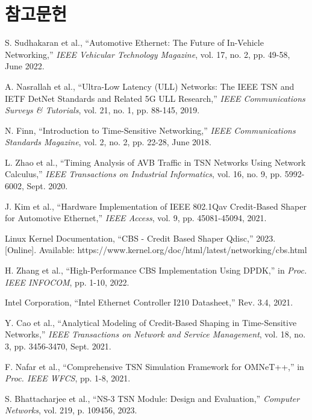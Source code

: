 \documentclass[twocolumn,10pt]{article}
\begin{document}
\section*{참고문헌}
\begin{thebibliography}{99}

S. Sudhakaran et al., ``Automotive Ethernet: The Future of In-Vehicle Networking,'' \textit{IEEE Vehicular Technology Magazine}, vol. 17, no. 2, pp. 49-58, June 2022.

A. Nasrallah et al., ``Ultra-Low Latency (ULL) Networks: The IEEE TSN and IETF DetNet Standards and Related 5G ULL Research,'' \textit{IEEE Communications Surveys \& Tutorials}, vol. 21, no. 1, pp. 88-145, 2019.

N. Finn, ``Introduction to Time-Sensitive Networking,'' \textit{IEEE Communications Standards Magazine}, vol. 2, no. 2, pp. 22-28, June 2018.

L. Zhao et al., ``Timing Analysis of AVB Traffic in TSN Networks Using Network Calculus,'' \textit{IEEE Transactions on Industrial Informatics}, vol. 16, no. 9, pp. 5992-6002, Sept. 2020.

J. Kim et al., ``Hardware Implementation of IEEE 802.1Qav Credit-Based Shaper for Automotive Ethernet,'' \textit{IEEE Access}, vol. 9, pp. 45081-45094, 2021.

Linux Kernel Documentation, ``CBS - Credit Based Shaper Qdisc,'' 2023. [Online]. Available: https://www.kernel.org/doc/html/latest/networking/cbs.html

H. Zhang et al., ``High-Performance CBS Implementation Using DPDK,'' in \textit{Proc. IEEE INFOCOM}, pp. 1-10, 2022.

Intel Corporation, ``Intel Ethernet Controller I210 Datasheet,'' Rev. 3.4, 2021.

Y. Cao et al., ``Analytical Modeling of Credit-Based Shaping in Time-Sensitive Networks,'' \textit{IEEE Transactions on Network and Service Management}, vol. 18, no. 3, pp. 3456-3470, Sept. 2021.

F. Nafar et al., ``Comprehensive TSN Simulation Framework for OMNeT++,'' in \textit{Proc. IEEE WFCS}, pp. 1-8, 2021.

S. Bhattacharjee et al., ``NS-3 TSN Module: Design and Evaluation,'' \textit{Computer Networks}, vol. 219, p. 109456, 2023.


\end{thebibliography}
\end{document}
